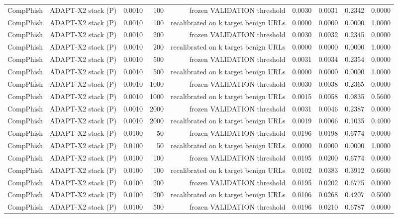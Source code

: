 \begin{table}[t]
\begin{tabular}{llrrrrrrr}
CompPhish & ADAPT-X2 stack (P) & 0.0010 & 100 & frozen VALIDATION threshold & 0.0030 & 0.0031 & 0.2342 & 0.0000 \\
CompPhish & ADAPT-X2 stack (P) & 0.0010 & 100 & recalibrated on k target benign URLs & 0.0000 & 0.0000 & 0.0000 & 1.0000 \\
CompPhish & ADAPT-X2 stack (P) & 0.0010 & 200 & frozen VALIDATION threshold & 0.0030 & 0.0032 & 0.2345 & 0.0000 \\
CompPhish & ADAPT-X2 stack (P) & 0.0010 & 200 & recalibrated on k target benign URLs & 0.0000 & 0.0000 & 0.0000 & 1.0000 \\
CompPhish & ADAPT-X2 stack (P) & 0.0010 & 500 & frozen VALIDATION threshold & 0.0031 & 0.0034 & 0.2354 & 0.0000 \\
CompPhish & ADAPT-X2 stack (P) & 0.0010 & 500 & recalibrated on k target benign URLs & 0.0000 & 0.0000 & 0.0000 & 1.0000 \\
CompPhish & ADAPT-X2 stack (P) & 0.0010 & 1000 & frozen VALIDATION threshold & 0.0030 & 0.0038 & 0.2365 & 0.0000 \\
CompPhish & ADAPT-X2 stack (P) & 0.0010 & 1000 & recalibrated on k target benign URLs & 0.0015 & 0.0058 & 0.0835 & 0.5600 \\
CompPhish & ADAPT-X2 stack (P) & 0.0010 & 2000 & frozen VALIDATION threshold & 0.0031 & 0.0046 & 0.2387 & 0.0000 \\
CompPhish & ADAPT-X2 stack (P) & 0.0010 & 2000 & recalibrated on k target benign URLs & 0.0019 & 0.0066 & 0.1035 & 0.4000 \\
CompPhish & ADAPT-X2 stack (P) & 0.0100 & 50 & frozen VALIDATION threshold & 0.0196 & 0.0198 & 0.6774 & 0.0000 \\
CompPhish & ADAPT-X2 stack (P) & 0.0100 & 50 & recalibrated on k target benign URLs & 0.0000 & 0.0000 & 0.0000 & 1.0000 \\
CompPhish & ADAPT-X2 stack (P) & 0.0100 & 100 & frozen VALIDATION threshold & 0.0195 & 0.0200 & 0.6774 & 0.0000 \\
CompPhish & ADAPT-X2 stack (P) & 0.0100 & 100 & recalibrated on k target benign URLs & 0.0102 & 0.0383 & 0.3912 & 0.6600 \\
CompPhish & ADAPT-X2 stack (P) & 0.0100 & 200 & frozen VALIDATION threshold & 0.0195 & 0.0202 & 0.6775 & 0.0000 \\
CompPhish & ADAPT-X2 stack (P) & 0.0100 & 200 & recalibrated on k target benign URLs & 0.0106 & 0.0268 & 0.4207 & 0.5000 \\
CompPhish & ADAPT-X2 stack (P) & 0.0100 & 500 & frozen VALIDATION threshold & 0.0196 & 0.0210 & 0.6787 & 0.0000 \\

\end{tabular}
\end{table}
